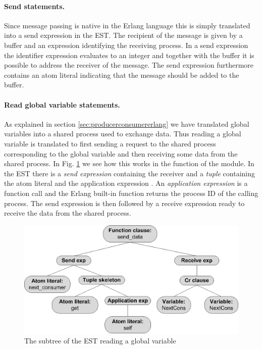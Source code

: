 \paragraph*{Send statements.}
Since message passing is native in the Erlang language this is simply translated into a send expression in the EST. The recipient of the message is given by a buffer and an expression identifying the receiving process. In a send expression the identifier expression evaluates to an integer and together with the buffer it is possible to address the receiver of the message. The send expression furthermore contains an atom literal  indicating that the message should be added to the buffer. 

\paragraph*{Read global variable statements.}
As explained in section \ref{sec:producerconsumererlang} we have translated global variables into a shared process used to exchange data. Thus reading a global variable is translated to first sending a  request to the shared process corresponding to the global variable and then receiving some data from the shared process. In Fig. \ref{fig:readglobalvarexp} we see how this works in the  function of the  module. In the EST there is a \emph{send expression} containing the receiver  and a \emph{tuple} containing the atom literal  and the application expression . An \emph{application expression} is a function call and the Erlang built-in function  returns the process ID of the calling process. The send expression is then followed by a receive expression ready to receive the data from the shared process.

\begin{figure}[h!]
\centering
\includegraphics[scale=0.7]{translation/ast_to_est/graphics/producerest04.eps}
\caption{The subtree of the EST reading a global variable}
\label{fig:readglobalvarexp}
\end{figure}


